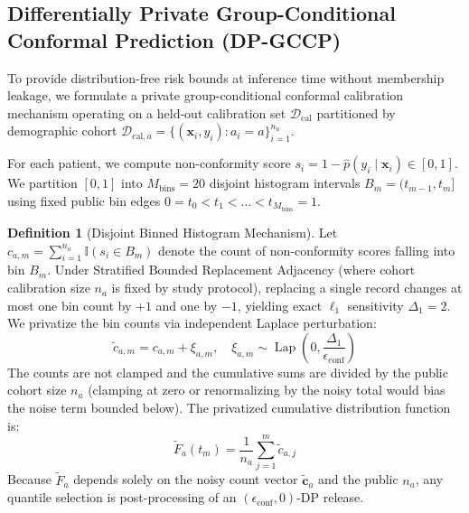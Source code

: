 \documentclass[3p,12pt]{elsarticle}
\theoremstyle{plain}
\theoremstyle{definition}
\newtheorem{definition}{Definition}
\begin{document}
\subsection{Differentially Private Group-Conditional Conformal Prediction (DP-GCCP)}
\label{sec:dp_gccp}

To provide distribution-free risk bounds at inference time without membership leakage, we formulate a private group-conditional conformal calibration mechanism operating on a held-out calibration set $\mathcal{D}_{\text{cal}}$ partitioned by demographic cohort $\mathcal{D}_{\text{cal}, a} = \{(\mathbf{x}_i, y_i) : a_i = a\}_{i=1}^{n_a}$.

For each patient, we compute non-conformity score $s_i = 1 - \hat{p}(y_i \mid \mathbf{x}_i) \in [0, 1]$. We partition $[0, 1]$ into $M_{\text{bins}} = 20$ disjoint histogram intervals $B_m = (t_{m-1}, t_m]$ using fixed public bin edges $0 = t_0 < t_1 < \dots < t_{M_{\text{bins}}} = 1$.

\begin{definition}[Disjoint Binned Histogram Mechanism]
Let $c_{a, m} = \sum_{i=1}^{n_a} \mathbb{I}(s_i \in B_m)$ denote the count of non-conformity scores falling into bin $B_m$. Under Stratified Bounded Replacement Adjacency (where cohort calibration size $n_a$ is fixed by study protocol), replacing a single record changes at most one bin count by $+1$ and one by $-1$, yielding exact $\ell_1$ sensitivity $\Delta_1 = 2$. We privatize the bin counts via independent Laplace perturbation:
\begin{equation}
    \tilde{c}_{a, m} = c_{a, m} + \xi_{a, m}, \quad \xi_{a, m} \sim \operatorname{Lap}\left(0, \frac{\Delta_1}{\epsilon_{\text{conf}}}\right)
\end{equation}
The counts are not clamped and the cumulative sums are divided by the public cohort size $n_a$ (clamping at zero or renormalizing by the noisy total would bias the noise term bounded below). The privatized cumulative distribution function is:
\begin{equation}
    \widetilde{F}_a(t_m) = \frac{1}{n_a}\sum_{j=1}^m \tilde{c}_{a, j}
\end{equation}
Because $\widetilde{F}_a$ depends solely on the noisy count vector $\tilde{\mathbf{c}}_a$ and the public $n_a$, any quantile selection is post-processing of an $(\epsilon_{\text{conf}}, 0)$-DP release.
\end{definition}
\end{document}
